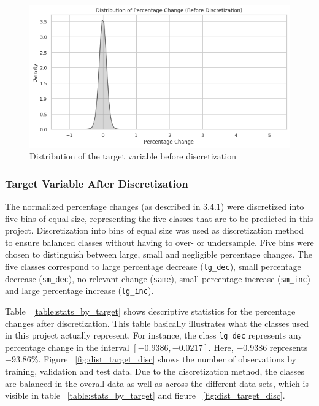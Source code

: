 \documentclass{article}
\begin{document}
	
	\begin{figure}[h!]
		\includegraphics[width=\linewidth]{img/dist_target_nondisc.png}
		\caption{Distribution of the target variable before discretization}
		\label{fig:dist_target_nondisc}
	\end{figure}

	\subsubsection{Target Variable After Discretization}
		
	The normalized percentage changes (as described in 3.4.1) were discretized into five bins of equal size, representing the five classes that are to be predicted in this project. Discretization into bins of equal size was used as discretization method to ensure balanced classes without having to over- or undersample. Five bins were chosen to distinguish between large, small and negligible percentage changes. The five classes correspond to large percentage decrease (\lstinline{lg_dec}), small percentage decrease (\lstinline{sm_dec}), no relevant change (\lstinline{same}), small percentage increase (\lstinline{sm_inc}) and large percentage increase (\lstinline{lg_inc}).
	
	Table ~\ref{table:stats_by_target} shows descriptive statistics for the percentage changes after discretization. This table basically illustrates what the classes used in this project actually represent. For instance, the class  \lstinline{lg_dec} represents any percentage change in the interval $[-0.9386, -0.0217]$. Here, $-0.9386$ represents $-93.86$\%. Figure ~\ref{fig:dist_target_disc} shows the number of observations by training, validation and test data. Due to the discretization method, the classes are balanced in the overall data as well as across the different data sets, which is visible in table ~\ref{table:stats_by_target} and figure ~\ref{fig:dist_target_disc}.
	
\end{document}
